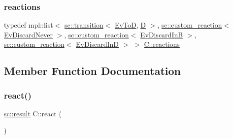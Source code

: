 \subsubsection{\texorpdfstring{reactions}{reactions}\hspace{0.1cm}{\footnotesize\ttfamily [2/2]}}
{\footnotesize\ttfamily typedef mpl\+::list$<$ \mbox{\hyperlink{classboost_1_1statechart_1_1transition}{sc\+::transition}}$<$ \mbox{\hyperlink{struct_ev_to_d}{Ev\+ToD}}, \mbox{\hyperlink{struct_d}{D}} $>$, \mbox{\hyperlink{classboost_1_1statechart_1_1custom__reaction}{sc\+::custom\+\_\+reaction}}$<$ \mbox{\hyperlink{struct_ev_discard_never}{Ev\+Discard\+Never}} $>$, \mbox{\hyperlink{classboost_1_1statechart_1_1custom__reaction}{sc\+::custom\+\_\+reaction}}$<$ \mbox{\hyperlink{struct_ev_discard_in_b}{Ev\+Discard\+InB}} $>$, \mbox{\hyperlink{classboost_1_1statechart_1_1custom__reaction}{sc\+::custom\+\_\+reaction}}$<$ \mbox{\hyperlink{struct_ev_discard_in_d}{Ev\+Discard\+InD}} $>$ $>$ \mbox{\hyperlink{struct_c_a1891987db7cdbea5f19084087b9174fa}{C\+::reactions}}}



\subsection{Member Function Documentation}
\mbox{\label{struct_c_a7c66bc54e8f268346ec27933ad446d5d}} 
\subsubsection{\texorpdfstring{react()}{react()}\hspace{0.1cm}{\footnotesize\ttfamily [1/3]}}
{\footnotesize\ttfamily \mbox{\hyperlink{namespaceboost_1_1statechart_abe807f6598b614d6d87bb951ecd92331}{sc\+::result}} C\+::react (\begin{DoxyParamCaption}\item[{const \mbox{\hyperlink{struct_ev_discard_never}{Ev\+Discard\+Never}} \&}]{ }\end{DoxyParamCaption})\hspace{0.3cm}{\ttfamily [inline]}}

